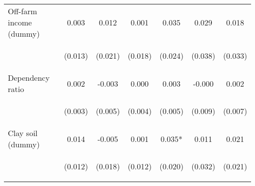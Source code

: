 \begin{center}
\begin{tabular}{lcccccc}
Off-farm income (dummy) & 0.003 & 0.012 & 0.001 & 0.035 & 0.029 & 0.018 \\
\vspace{4pt} & \begin{footnotesize}(0.013)\end{footnotesize} & \begin{footnotesize}(0.021)\end{footnotesize} & \begin{footnotesize}(0.018)\end{footnotesize} & \begin{footnotesize}(0.024)\end{footnotesize} & \begin{footnotesize}(0.038)\end{footnotesize} & \begin{footnotesize}(0.033)\end{footnotesize} \\
Dependency ratio & 0.002 & -0.003 & 0.000 & 0.003 & -0.000 & 0.002 \\
\vspace{4pt} & \begin{footnotesize}(0.003)\end{footnotesize} & \begin{footnotesize}(0.005)\end{footnotesize} & \begin{footnotesize}(0.004)\end{footnotesize} & \begin{footnotesize}(0.005)\end{footnotesize} & \begin{footnotesize}(0.009)\end{footnotesize} & \begin{footnotesize}(0.007)\end{footnotesize} \\
Clay soil (dummy) & 0.014 & -0.005 & 0.001 & 0.035* & 0.011 & 0.021 \\
\vspace{4pt} & \begin{footnotesize}(0.012)\end{footnotesize} & \begin{footnotesize}(0.018)\end{footnotesize} & \begin{footnotesize}(0.012)\end{footnotesize} & \begin{footnotesize}(0.020)\end{footnotesize} & \begin{footnotesize}(0.032)\end{footnotesize} & \begin{footnotesize}(0.021)\end{footnotesize} \\

\end{tabular}
\end{center}

